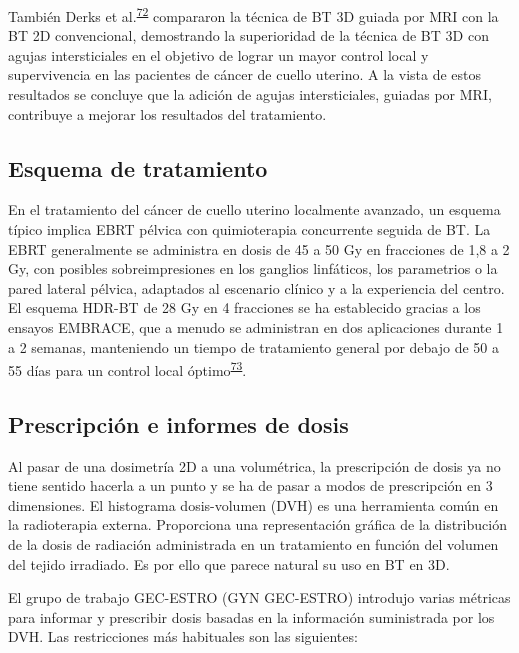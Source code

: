 \documentclass[
  a4paper,
]{scrreprt}
\begin{document}
También Derks et
al.\textsuperscript{\protect\hyperlink{ref-derks2018}{72}} compararon la
técnica de BT 3D guiada por MRI con la BT 2D convencional, demostrando
la superioridad de la técnica de BT 3D con agujas intersticiales en el
objetivo de lograr un mayor control local y supervivencia en las
pacientes de cáncer de cuello uterino. A la vista de estos resultados se
concluye que la adición de agujas intersticiales, guiadas por MRI,
contribuye a mejorar los resultados del tratamiento.

\hypertarget{sec-esquemadetratamiento}{%
\subsection{Esquema de tratamiento}\label{sec-esquemadetratamiento}}

En el tratamiento del cáncer de cuello uterino localmente avanzado, un
esquema típico implica EBRT pélvica con quimioterapia concurrente
seguida de BT. La EBRT generalmente se administra en dosis de 45 a 50 Gy
en fracciones de 1,8 a 2 Gy, con posibles sobreimpresiones en los
ganglios linfáticos, los parametrios o la pared lateral pélvica,
adaptados al escenario clínico y a la experiencia del centro. El esquema
HDR-BT de 28 Gy en 4 fracciones se ha establecido gracias a los ensayos
EMBRACE, que a menudo se administran en dos aplicaciones durante 1 a 2
semanas, manteniendo un tiempo de tratamiento general por debajo de 50 a
55 días para un control local
óptimo\textsuperscript{\protect\hyperlink{ref-mazeron2015}{73}}.

\hypertarget{prescripciuxf3n-e-informes-de-dosis}{%
\subsection{Prescripción e informes de
dosis}\label{prescripciuxf3n-e-informes-de-dosis}}

Al pasar de una dosimetría 2D a una volumétrica, la prescripción de
dosis ya no tiene sentido hacerla a un punto y se ha de pasar a modos de
prescripción en 3 dimensiones. El histograma dosis-volumen (DVH) es una
herramienta común en la radioterapia externa. Proporciona una
representación gráfica de la distribución de la dosis de radiación
administrada en un tratamiento en función del volumen del tejido
irradiado. Es por ello que parece natural su uso en BT en 3D.

El grupo de trabajo GEC-ESTRO (GYN GEC-ESTRO) introdujo varias métricas
para informar y prescribir dosis basadas en la información suministrada
por los DVH. Las restricciones más habituales son las siguientes:
\end{document}
